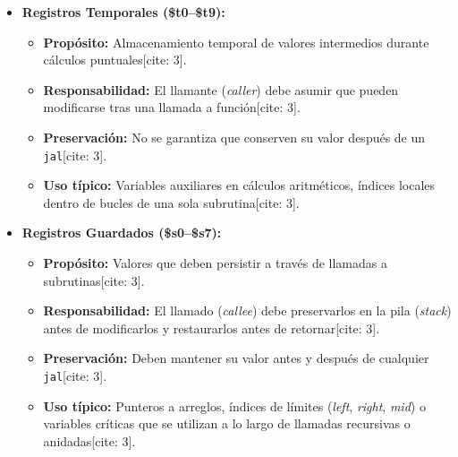 \documentclass[12pt,a4paper]{article}
\begin{document}
\begin{itemize}
    \item \textbf{Registros Temporales (\$t0--\$t9):}
    \begin{itemize}
        \item \textbf{Propósito:} Almacenamiento temporal de valores intermedios durante cálculos puntuales[cite: 3].
        \item \textbf{Responsabilidad:} El llamante (\textit{caller}) debe asumir que pueden modificarse tras una llamada a función[cite: 3].
        \item \textbf{Preservación:} No se garantiza que conserven su valor después de un \texttt{jal}[cite: 3].
        \item \textbf{Uso típico:} Variables auxiliares en cálculos aritméticos, índices locales dentro de bucles de una sola subrutina[cite: 3].
    \end{itemize}
    \item \textbf{Registros Guardados (\$s0--\$s7):}
    \begin{itemize}
        \item \textbf{Propósito:} Valores que deben persistir a través de llamadas a subrutinas[cite: 3].
        \item \textbf{Responsabilidad:} El llamado (\textit{callee}) debe preservarlos en la pila (\textit{stack}) antes de modificarlos y restaurarlos antes de retornar[cite: 3].
        \item \textbf{Preservación:} Deben mantener su valor antes y después de cualquier \texttt{jal}[cite: 3].
        \item \textbf{Uso típico:} Punteros a arreglos, índices de límites (\textit{left}, \textit{right}, \textit{mid}) o variables críticas que se utilizan a lo largo de llamadas recursivas o anidadas[cite: 3].
    \end{itemize}
\end{itemize}
\end{document}
